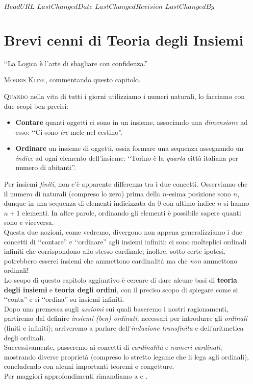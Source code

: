 \svnidlong
{$HeadURL$}
{$LastChangedDate$}
{$LastChangedRevision$}
{$LastChangedBy$}

\chapter{Brevi cenni di Teoria degli Insiemi}
\begin{introduction}
‘‘La Logica è l'arte di sbagliare con confidenza.''
\begin{flushright}
	\textsc{Morris Kline,} commentando questo capitolo.
\end{flushright}
\end{introduction}
\lettrine[findent=1pt, nindent=0pt]{Q}{uando} nella vita di tutti i giorni utilizziamo i numeri naturali, lo facciamo con due scopi ben precisi:
\begin{itemize}
	\item \textbf{Contare} quanti oggetti ci sono in un insieme, associando una \textit{dimensione} ad esso: ‘‘Ci sono \textit{tre} mele nel cestino''.
	\item \textbf{Ordinare} un insieme di oggetti, ossia formare una sequenza assegnando un \textit{indice} ad ogni elemento dell'insieme: ‘‘Torino è la \textit{quarta} città italiana per numero di abitanti''.
\end{itemize}
Per insiemi \textit{finiti}, non c'è apparente differenza tra i due concetti. Osserviamo che il numero di naturali (compreso lo zero) prima della $n$-esima posizione sono $n$, dunque in una sequenza di elementi indicizzata da $0$ con ultimo indice $n$ si hanno $n+1$ elementi. In altre parole, ordinando gli elementi è possibile sapere quanti sono e viceversa.\\
Questa due nozioni, come vedremo, divergono non appena generalizziamo i due concetti di ‘‘contare'' e ‘‘ordinare'' agli insiemi infiniti: ci sono molteplici ordinali infiniti che corrispondono allo stesso cardinale; inoltre, sotto certe ipotesi, potrebbero esserci insiemi che ammettono cardinalità ma che \textit{non} ammettono ordinali!\\
Lo scopo di questo capitolo aggiuntivo è cercare di dare alcune basi di \textbf{teoria degli insiemi} e \textbf{teoria degli ordini}, con il preciso scopo di spiegare come si ‘‘conta'' e si ‘‘ordina'' su insiemi infiniti.\\
Dopo una premessa sugli \textit{assiomi} sui quali baseremo i nostri ragionamenti, partiremo dal definire \textit{insiemi (ben) ordinati}, necessari per introdurre gli \textit{ordinali} (finiti e infiniti); arriveremo a parlare dell'\textit{induzione transfinita} e dell'aritmetica degli ordinali.\\
Successivamente, passeremo ai concetti di \textit{cardinalità} e \textit{numeri cardinali}, mostrando diverse proprietà (compreso lo stretto legame che li lega agli ordinali), concludendo con alcuni importanti teoremi e congetture.\\
Per maggiori approfondimenti rimandiamo a \cite{jech:2003settheory} e \cite{andretta:2021elements}.
